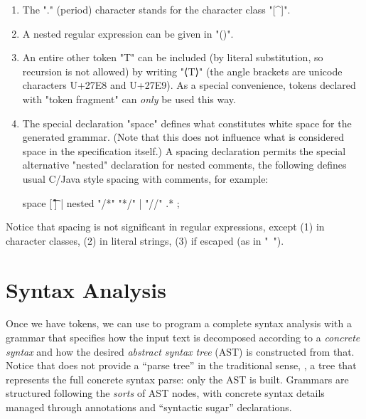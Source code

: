 \documentclass[11pt]{article} %
\begin{document}
\begin{manual}
\begin{enumerate}
  \item The "." (period) character stands for the character class "[^\n]".

  \item A nested regular expression can be given in "()".

  \item An entire other token "T" can be included (by literal substitution, so recursion is not
    allowed) by writing "⟨T⟩" (the angle brackets are unicode characters U+27E8 and U+27E9). As a
    special convenience, tokens declared with "token fragment" can \emph{only} be used this way.

  \item The special declaration "space" defines what constitutes white space for the generated
    grammar. (Note that this does not influence what is considered space in the specification
    itself.) A spacing declaration permits the special alternative "nested" declaration for nested
    comments, the following defines usual C/Java style spacing with comments, for example:
\begin{code}[]
space [ \t\f\r\n] | nested "/*" "*/" | "//" .* ;
\end{code}

  \end{enumerate}
  Notice that spacing is not significant in regular expressions, except (1) in character classes,
  (2) in literal strings, (3) if escaped (as in "\ ").
\end{manual}


\section{Syntax Analysis}
\label{sec:syntax}

Once we have tokens, we can use \HAX to program a complete syntax analysis with a grammar that
specifies how the input text is decomposed according to a \emph{concrete syntax} and how the desired
\emph{abstract syntax tree} (AST) is constructed from that. Notice that \HAX does not provide a
``parse tree'' in the traditional sense, \ie, a tree that represents the full concrete syntax parse:
only the AST is built.  Grammars are structured following the \emph{sorts} of AST nodes, with
concrete syntax details managed through annotations and ``syntactic sugar'' declarations.
\end{document}
